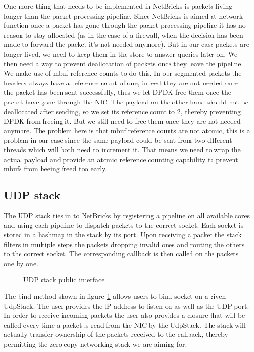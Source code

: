 One more thing that needs to be implemented in NetBricks is packets
living longer than the packet processing pipeline. Since NetBricks is
aimed at network function once a packet has gone through the packet
processing pipeline it has no reason to stay allocated (as in the case
of a firewall, when the decision has been made to forward the packet
it's not needed anymore). But in our case packets are longer lived, we
need to keep them in the store to answer queries later on. We then
need a way to prevent deallocation of packets once they leave the
pipeline. We make use of mbuf reference counts to do this. In our
segmented packets the headers always have a reference count of one,
indeed they are not needed once the packet has been sent successfully,
thus we let DPDK free them once the packet have gone through the
NIC\@. The payload on the other hand should not be deallocated after
sending, so we set its reference count to 2, thereby preventing DPDK
from freeing it. But we still need to free them once they are not
needed anymore. The problem here is that mbuf reference counts are not
atomic, this is a problem in our case since the same payload could be
sent from two different threads which will both need to increment
it. That means we need to wrap the actual payload and provide an
atomic reference counting capability to prevent mbufs from beeing
freed too early.

\subsection{UDP stack}

The UDP stack ties in to NetBricks by registering a pipeline on all
available cores and using each pipeline to dispatch packets to the
correct socket. Each socket is stored in a hashmap in the stack by its
port. Upon receiving a packet the stack filters in multiple steps the
packets dropping invalid ones and routing the others to the correct
socket. The corresponding callback is then called on the packets one
by one.

\begin{figure}[htb!]
  
  \label{code:socket-registration}
  \caption{UDP stack public interface}
\end{figure}

The bind method shown in figure~\ref{code:socket-registration} allows
users to bind socket on a given UdpStack. The user provides the IP
address to listen on as well as the UDP port. In order to receive
incoming packets the user also provides a closure that will be called
every time a packet is read from the NIC by the UdpStack. The stack
will actually transfer ownership of the packets received to the
callback, thereby permitting the zero copy networking stack we are
aiming for.

